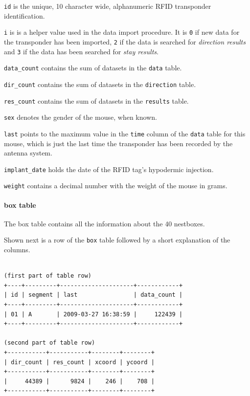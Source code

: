\begin{mydesc}
\item \lstinline|id| is the unique, 10 character wide, alphanumeric RFID transponder identification.
\item \lstinline|i| is is a helper value used in the data import procedure. It is \lstinline|0| if new data for the transponder has been imported, \lstinline|2| if the data is searched for \textit{direction results} and \lstinline|3| if the data has been searched for \textit{stay results}.
\item \lstinline|data_count| contains the sum of datasets in the \lstinline|data| table.
\item \lstinline|dir_count| contains the sum of datasets in the \lstinline|direction| table.
\item \lstinline|res_count| contains the sum of datasets in the \lstinline|results| table.
\item \lstinline|sex| denotes the gender of the mouse, when known.
\item \lstinline|last| points to the maximum value in the \lstinline|time| column of the \lstinline|data| table for this mouse, which is just the last time the transponder has been recorded by the antenna system.
\item \lstinline|implant_date| holds the date of the RFID tag's hypodermic injection.
\item \lstinline|weight| contains a decimal number with the weight of the mouse in grams.
\end{mydesc}

\paragraph{box table}
\label{para:box_table}

The box table contains all the information about the 40 nestboxes. 

Shown next is a row of the \lstinline|box| table followed by a short explanation of the columns.
\codescript
{}
\begin{lstlisting}[frame=none]

(first part of table row)
+----+---------+---------------------+------------+
| id | segment | last                | data_count |
+----+---------+---------------------+------------+
| 01 | A       | 2009-03-27 16:38:59 |     122439 | 
+----+---------+---------------------+------------+

(second part of table row)
+-----------+-----------+--------+--------+
| dir_count | res_count | xcoord | ycoord |
+-----------+-----------+--------+--------+
|     44389 |      9824 |    246 |    708 | 
+-----------+-----------+--------+--------+

\end{lstlisting}

